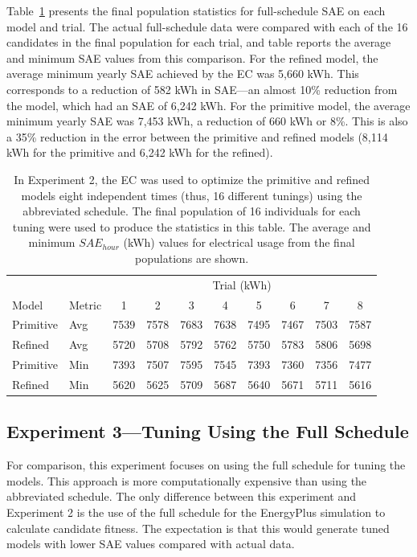 \documentclass[preprint, review, 12pt]{elsarticle}
\begin{document}
Table~\ref{tab:hourly-abbrev} presents the final population statistics for full-schedule SAE on each model and trial. The actual full-schedule data were compared with each of the 16 candidates in the final population for each trial, and table reports the average and minimum SAE values from this comparison. For the refined model, the average minimum yearly SAE achieved by the EC was 5,660 kWh. This corresponds to a reduction of 582 kWh in SAE---an almost 10\% reduction from the model, which had an SAE of 6,242 kWh. For the primitive model, the average minimum yearly SAE was 7,453 kWh, a reduction of 660 kWh or 8\%. This is also a 35\% reduction in the error between the primitive and refined models (8,114 kWh for the primitive and 6,242 kWh for the refined).


\begin{table}[htbp]
\centering
\caption{In Experiment 2, the EC was used to optimize the primitive and refined models eight independent times (thus, 16 different tunings) using the abbreviated schedule. The final population of 16 individuals for each tuning were used to produce the statistics in this table. The average and minimum $SAE_{hour}$ (kWh) values for electrical usage from the final populations are shown.}
\label{tab:hourly-abbrev}
\begin{tabular}{llcccccccc}
\toprule
 &  & \multicolumn{8}{c}{Trial (kWh)}\\
Model & Metric & 1 & 2 & 3 & 4 & 5 & 6 & 7 & 8\\
\midrule
Primitive & Avg & 7539 & 7578 & 7683 & 7638 & 7495 & 7467 & 7503 & 7587\\\rowcolor{DarkRow}
Refined   & Avg & 5720 & 5708 & 5792 & 5762 & 5750 & 5783 & 5806 & 5698\\
Primitive & Min & 7393 & 7507 & 7595 & 7545 & 7393 & 7360 & 7356 & 7477\\\rowcolor{DarkRow}
Refined   & Min & 5620 & 5625 & 5709 & 5687 & 5640 & 5671 & 5711 & 5616\\
\bottomrule
\end{tabular}
\end{table}


\subsection{Experiment 3---Tuning Using the Full Schedule}
\label{sub:experiment3}
For comparison, this experiment focuses on using the full schedule for tuning the models. This approach is more computationally expensive than using the abbreviated schedule. The only difference between this experiment and Experiment 2 is the use of the full schedule for the EnergyPlus simulation to calculate candidate fitness. The expectation is that this would generate tuned models with lower SAE values compared with actual data.
\end{document}
